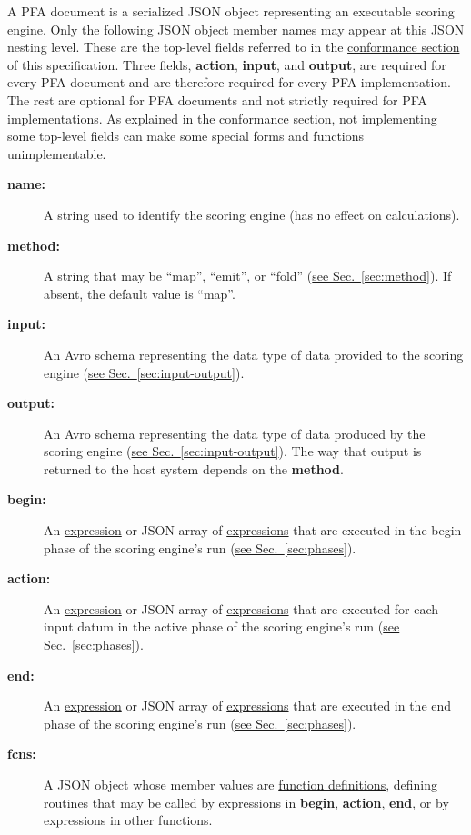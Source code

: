 \documentclass{article}
\newcommand{\PFAc}{\ttfamily\bfseries}
\newenvironment{allowedfields}%
  {\begin{center} \begin{minipage}{0.9\linewidth} \begin{description}}%
  {\end{description} \end{minipage} \end{center}}
\theoremstyle{definition}
\begin{document}
A PFA document is a serialized JSON object representing an executable scoring engine.  Only the following JSON object member names may appear at this JSON nesting level.  These are the top-level fields referred to in the \hyperlink{hsec:conformance}{conformance section} of this specification.  Three fields, {\PFAc action}, {\PFAc input}, and {\PFAc output}, are required for every PFA document and are therefore required for every PFA implementation.  The rest are optional for PFA documents and not strictly required for PFA implementations.  As explained in the conformance section, not implementing some top-level fields can make some special forms and functions unimplementable.

\begin{allowedfields}
\item[\PFAc name:] A string used to identify the scoring engine (has no effect on calculations).
\item[\PFAc method:] A string that may be ``map'', ``emit'', or ``fold'' (\hyperlink{hsec:method}{see Sec.~\ref{sec:method}}).  If absent, the default value is ``map''.
\item[\PFAc input:] An Avro schema representing the data type of data provided to the scoring engine (\hyperlink{hsec:input-output}{see Sec.~\ref{sec:input-output}}).
\item[\PFAc output:] An Avro schema representing the data type of data produced by the scoring engine (\hyperlink{hsec:input-output}{see Sec.~\ref{sec:input-output}}).  The way that output is returned to the host system depends on the {\PFAc method}.
\item[\PFAc begin:] An \hyperlink{hsec:expressions}{expression} or JSON array of \hyperlink{hsec:expressions}{expressions} that are executed in the begin phase of the scoring engine's run (\hyperlink{hsec:phases}{see Sec.~\ref{sec:phases}}).
\item[\PFAc action:] An \hyperlink{hsec:expressions}{expression} or JSON array of \hyperlink{hsec:expressions}{expressions} that are executed for each input datum in the active phase of the scoring engine's run (\hyperlink{hsec:phases}{see Sec.~\ref{sec:phases}}).
\item[\PFAc end:] An \hyperlink{hsec:expressions}{expression} or JSON array of \hyperlink{hsec:expressions}{expressions} that are executed in the end phase of the scoring engine's run (\hyperlink{hsec:phases}{see Sec.~\ref{sec:phases}}).
\item[\PFAc fcns:] A JSON object whose member values are \hyperlink{hsec:fcndef}{function definitions}, defining routines that may be called by expressions in {\PFAc begin}, {\PFAc action}, {\PFAc end}, or by expressions in other functions.

\end{allowedfields}
\end{document}
